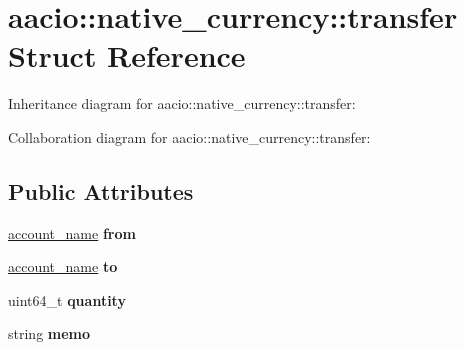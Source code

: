 \hypertarget{structaacio_1_1native__currency_1_1transfer}{}\section{aacio\+:\+:native\+\_\+currency\+:\+:transfer Struct Reference}
\label{structaacio_1_1native__currency_1_1transfer}


Inheritance diagram for aacio\+:\+:native\+\_\+currency\+:\+:transfer\+:


Collaboration diagram for aacio\+:\+:native\+\_\+currency\+:\+:transfer\+:
\subsection*{Public Attributes}
\begin{DoxyCompactItemize}
\item 
\mbox{\label{structaacio_1_1native__currency_1_1transfer_a9e7b55203ecfac424a4385ce30ffb0bc}} 
\mbox{\hyperlink{structaacio_1_1chain_1_1name}{account\+\_\+name}} {\bfseries from}
\item 
\mbox{\label{structaacio_1_1native__currency_1_1transfer_a0bd7af4c867e11084cdc3de948ddf4bf}} 
\mbox{\hyperlink{structaacio_1_1chain_1_1name}{account\+\_\+name}} {\bfseries to}
\item 
\mbox{\label{structaacio_1_1native__currency_1_1transfer_a446d05826a85c05eb57304109af07481}} 
uint64\+\_\+t {\bfseries quantity}
\item 
\mbox{\label{structaacio_1_1native__currency_1_1transfer_a0c4fa40127cf0ee7579aec555c4e2a86}} 
string {\bfseries memo}
\end{DoxyCompactItemize}
